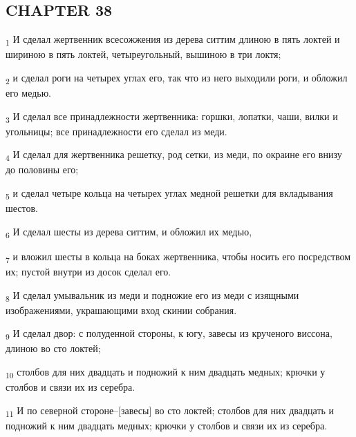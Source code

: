 \subsection{CHAPTER 38}
\begin{tcolorbox}
\textsubscript{1} И сделал жертвенник всесожжения из дерева ситтим длиною в пять локтей и шириною в пять локтей, четыреугольный, вышиною в три локтя;
\end{tcolorbox}
\begin{tcolorbox}
\textsubscript{2} и сделал роги на четырех углах его, так что из него выходили роги, и обложил его медью.
\end{tcolorbox}
\begin{tcolorbox}
\textsubscript{3} И сделал все принадлежности жертвенника: горшки, лопатки, чаши, вилки и угольницы; все принадлежности его сделал из меди.
\end{tcolorbox}
\begin{tcolorbox}
\textsubscript{4} И сделал для жертвенника решетку, род сетки, из меди, по окраине его внизу до половины его;
\end{tcolorbox}
\begin{tcolorbox}
\textsubscript{5} и сделал четыре кольца на четырех углах медной решетки для вкладывания шестов.
\end{tcolorbox}
\begin{tcolorbox}
\textsubscript{6} И сделал шесты из дерева ситтим, и обложил их медью,
\end{tcolorbox}
\begin{tcolorbox}
\textsubscript{7} и вложил шесты в кольца на боках жертвенника, чтобы носить его посредством их; пустой внутри из досок сделал его.
\end{tcolorbox}
\begin{tcolorbox}
\textsubscript{8} И сделал умывальник из меди и подножие его из меди с изящными изображениями, украшающими вход скинии собрания.
\end{tcolorbox}
\begin{tcolorbox}
\textsubscript{9} И сделал двор: с полуденной стороны, к югу, завесы из крученого виссона, длиною во сто локтей;
\end{tcolorbox}
\begin{tcolorbox}
\textsubscript{10} столбов для них двадцать и подножий к ним двадцать медных; крючки у столбов и связи их из серебра.
\end{tcolorbox}
\begin{tcolorbox}
\textsubscript{11} И по северной стороне--[завесы] во сто локтей; столбов для них двадцать и подножий к ним двадцать медных; крючки у столбов и связи их из серебра.
\end{tcolorbox}
